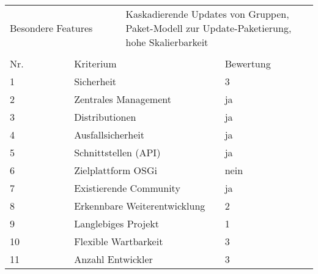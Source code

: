 \begin{table}[H]
\begin{framed}
\begin{tabular}{l|l|l|l}
  \multicolumn{2}{l|}{Besondere Features} & \multicolumn{2}{p{8cm}}{Kaskadierende Updates von Gruppen, Paket-Modell zur Update-Paketierung, hohe Skalierbarkeit} \\
  
  \multicolumn{4}{l}{} \\
  
  Nr. &  \multicolumn{2}{l|}{Kriterium} & Bewertung \\
  \midrule
  1 & \multicolumn{2}{l|}{Sicherheit}
  & 3 \\
  
  2 & \multicolumn{2}{l|}{Zentrales Management}
  & ja \\
  
  3 & \multicolumn{2}{l|}{Distributionen}
  & ja \\
  
  4 & \multicolumn{2}{l|}{Ausfallsicherheit}
  & ja \\
  
  5 & \multicolumn{2}{l|}{Schnittstellen (\ac{API})}
  & ja \\
  
  6 & \multicolumn{2}{l|}{Zielplattform OSGi}
  & nein \\
  
  7 & \multicolumn{2}{l|}{Existierende Community}
  & ja \\
  
  8 & \multicolumn{2}{l|}{Erkennbare Weiterentwicklung}
  & 2 \\
  
  9 & \multicolumn{2}{l|}{Langlebiges Projekt}
  & 1 \\
  
  10 & \multicolumn{2}{l|}{Flexible Wartbarkeit}
  & 3 \\
  
  11 & \multicolumn{2}{l|}{Anzahl Entwickler}
  & 3 \\
  \bottomrule
 \end{tabular}
 \label{tab:rating_hawkbit}
 \end{framed}
\end{table}

